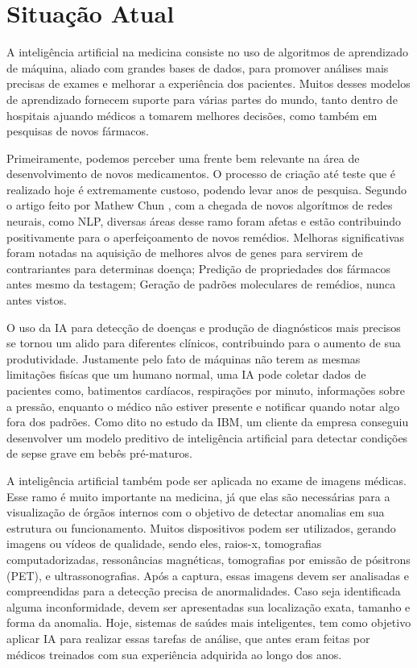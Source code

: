 
\chapter{Situação Atual}

\label{cha:Situação Atual}

A inteligência artificial na medicina consiste no uso de algoritmos de aprendizado de máquina, aliado com grandes bases de dados, para promover análises mais precisas de exames e melhorar a experiência dos pacientes. Muitos desses modelos de aprendizado fornecem suporte para várias partes do mundo, tanto dentro de hospitais ajuando médicos a tomarem melhores decisões, como também em pesquisas de novos fármacos.

Primeiramente, podemos perceber uma frente bem relevante na área de desenvolvimento de novos medicamentos. O processo de criação até teste que é realizado hoje é extremamente custoso, podendo levar anos de pesquisa. Segundo o artigo feito por Mathew Chun \cite{HARV1}, com a chegada de novos algorítmos de redes neurais, como NLP, diversas áreas desse ramo foram afetas e estão contribuindo positivamente para o aperfeiçoamento de novos remédios. Melhoras significativas foram notadas na aquisição de melhores alvos de genes para servirem de contrariantes para determinas doença; Predição de propriedades dos fármacos antes mesmo da testagem; Geração de padrões moleculares de remédios, nunca antes vistos.

O uso da IA para detecção de doenças e produção de diagnósticos mais precisos se tornou um alido para diferentes clínicos, contribuindo para o aumento de sua produtividade. Justamente pelo fato de máquinas não terem as mesmas limitações fisícas que um humano normal, uma IA pode coletar dados de pacientes como, batimentos cardíacos, respirações por minuto, informações sobre a pressão, enquanto o médico não estiver presente e notificar quando notar algo fora dos padrões. Como dito no estudo da IBM, um cliente da empresa conseguiu desenvolver um modelo preditivo de inteligência artificial para detectar condições de sepse grave em bebês pré-maturos. \cite{IBM1} %

A inteligência artificial também pode ser aplicada no exame de imagens médicas. Esse ramo é muito importante na medicina, já que elas são necessárias para a visualização de órgãos internos com o objetivo de detectar anomalias em sua estrutura ou funcionamento. Muitos dispositivos podem ser utilizados, gerando imagens ou vídeos de qualidade, sendo eles, raios-x, tomografias computadorizadas, ressonâncias magnéticas, tomografias por emissão de pósitrons (PET), e ultrassonografias. Após a captura, essas imagens devem ser analisadas e compreendidas para a detecção precisa de anormalidades. Caso seja identificada alguma inconformidade, devem ser apresentadas sua localização exata, tamanho e forma da anomalia. Hoje, sistemas de saúdes mais inteligentes, tem como objetivo aplicar IA para realizar essas tarefas de análise, que antes eram feitas por médicos treinados com sua experiência adquirida ao longo dos anos.


